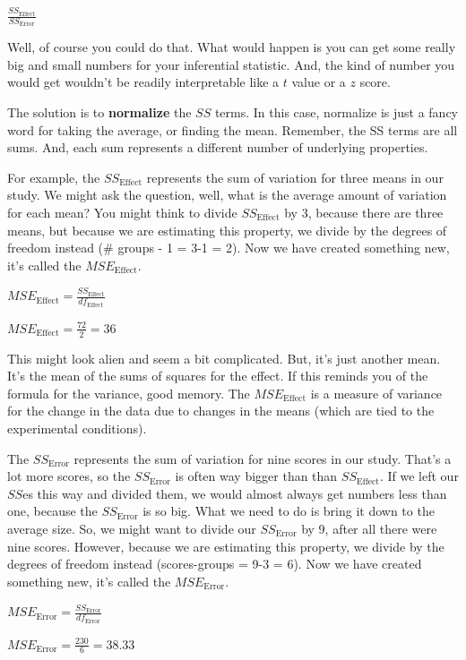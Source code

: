 \documentclass[
]{book}
\begin{document}
\(\frac{SS_\text{Effect}}{SS_\text{Error}}\)

Well, of course you could do that. What would happen is you can get some really big and small numbers for your inferential statistic. And, the kind of number you would get wouldn't be readily interpretable like a \(t\) value or a \(z\) score.

The solution is to \textbf{normalize} the \(SS\) terms. In this case, normalize is just a fancy word for taking the average, or finding the mean. Remember, the SS terms are all sums. And, each sum represents a different number of underlying properties.

For example, the \(SS_\text{Effect}\) represents the sum of variation for three means in our study. We might ask the question, well, what is the average amount of variation for each mean? You might think to divide \(SS_\text{Effect}\) by 3, because there are three means, but because we are estimating this property, we divide by the degrees of freedom instead (\# groups - 1 = 3-1 = 2). Now we have created something new, it's called the \(MSE_\text{Effect}\).

\(MSE_\text{Effect} = \frac{SS_\text{Effect}}{df_\text{Effect}}\)

\(MSE_\text{Effect} = \frac{72}{2} = 36\)

This might look alien and seem a bit complicated. But, it's just another mean. It's the mean of the sums of squares for the effect. If this reminds you of the formula for the variance, good memory. The \(MSE_\text{Effect}\) is a measure of variance for the change in the data due to changes in the means (which are tied to the experimental conditions).

The \(SS_\text{Error}\) represents the sum of variation for nine scores in our study. That's a lot more scores, so the \(SS_\text{Error}\) is often way bigger than than \(SS_\text{Effect}\). If we left our \(SS\)es this way and divided them, we would almost always get numbers less than one, because the \(SS_\text{Error}\) is so big. What we need to do is bring it down to the average size. So, we might want to divide our \(SS_\text{Error}\) by 9, after all there were nine scores. However, because we are estimating this property, we divide by the degrees of freedom instead (scores-groups = 9-3 = 6). Now we have created something new, it's called the \(MSE_\text{Error}\).

\(MSE_\text{Error} = \frac{SS_\text{Error}}{df_\text{Error}}\)

\(MSE_\text{Error} = \frac{230}{6} = 38.33\)
\end{document}
